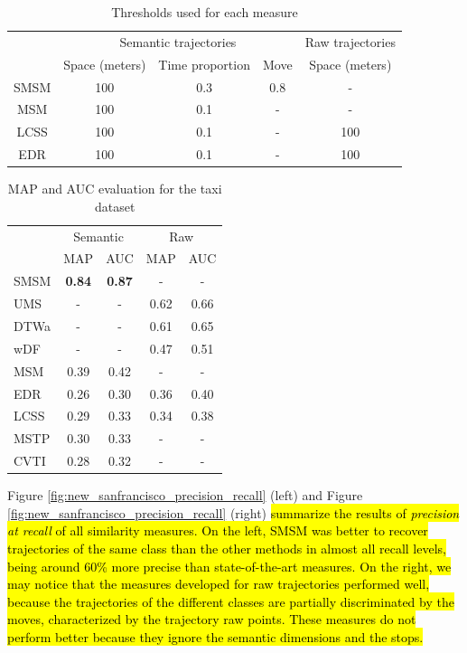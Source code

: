 \documentclass[12pt]{article}
\begin{document}
\begin{table}[!h]
\scriptsize
  \centering
  \begin{tabular}{|c|c|c|c|c|}
  	\hline
  & \multicolumn{3}{c|}{Semantic trajectories} & \multicolumn{1}{c|}{Raw trajectories} \\
 	\cline{2-5}
  & Space (meters) & Time proportion & Move & Space (meters) \\
  	\hline
 SMSM & 100 & 0.3 & 0.8 & - \\
 MSM & 100 & 0.1 & - & - \\
 LCSS & 100 & 0.1 & - & 100 \\
 EDR & 100 & 0.1 & - & 100 \\
    \hline
  \end{tabular}
  \caption{Thresholds used for each measure}
  \label{tab:new_san_francisco_thresholds}
\end{table}


\begin{table}[h]
\scriptsize
  \centering
  \begin{tabular}{|l|c|c|c|c|}
  	\hline
 & \multicolumn{2}{c}{Semantic} & \multicolumn{2}{|c|}{Raw} \\
 	\cline{2-5}
 & MAP & AUC & MAP & AUC \\
  	\hline
SMSM & \textbf{0.84} & \textbf{0.87} & - & -\\
UMS & - & - & 0.62 & 0.66 \\
DTWa & - & - & 0.61 & 0.65 \\
wDF & - & - & 0.47 & 0.51 \\
MSM & 0.39 & 0.42 & - & - \\
EDR & 0.26 & 0.30 & 0.36 & 0.40 \\
LCSS & 0.29 & 0.33 & 0.34 & 0.38 \\
MSTP & 0.30 & 0.33 & - & - \\
CVTI & 0.28 & 0.32 & - & - \\
    \hline
  \end{tabular}
  \caption{MAP and AUC evaluation for the taxi dataset}
  \label{tab:new_sanfrancisco_measures_map_auc}
\end{table}


Figure \ref{fig:new_sanfrancisco_precision_recall} (left) and Figure \ref{fig:new_sanfrancisco_precision_recall} (right) \hl{summarize the results of \emph{precision at recall}  of all similarity measures. On the left, SMSM was better to recover trajectories of the same class than the other methods in almost all recall levels, being around  60\% more precise than  state-of-the-art measures. On the right, we may notice that the measures developed for raw trajectories performed well, because the trajectories of the different classes are partially discriminated by the moves, characterized by the trajectory raw points. These measures do not perform better because they ignore the semantic dimensions and the stops.}
\end{document}
